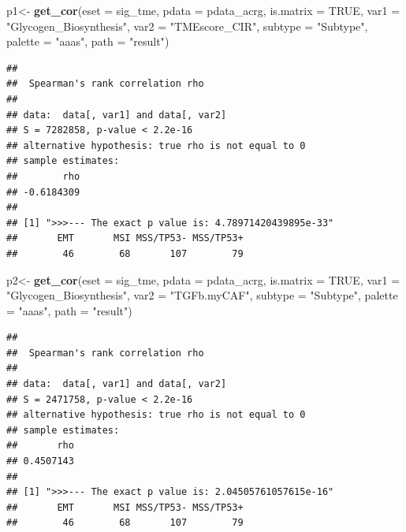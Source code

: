 \documentclass[
  12pt,
]{book}
\newenvironment{Shaded}{\begin{snugshade}}{\end{snugshade}}
\newcommand{\AttributeTok}[1]{\textcolor[rgb]{0.13,0.29,0.53}{#1}}
\newcommand{\ConstantTok}[1]{\textcolor[rgb]{0.56,0.35,0.01}{#1}}
\newcommand{\FunctionTok}[1]{\textcolor[rgb]{0.13,0.29,0.53}{\textbf{#1}}}
\newcommand{\NormalTok}[1]{#1}
\newcommand{\OtherTok}[1]{\textcolor[rgb]{0.56,0.35,0.01}{#1}}
\newcommand{\StringTok}[1]{\textcolor[rgb]{0.31,0.60,0.02}{#1}}
\begin{document}
\begin{Shaded}
\begin{Highlighting}[]
\NormalTok{p1}\OtherTok{\textless{}{-}} \FunctionTok{get\_cor}\NormalTok{(}\AttributeTok{eset =}\NormalTok{ sig\_tme, }\AttributeTok{pdata =}\NormalTok{ pdata\_acrg, }\AttributeTok{is.matrix =} \ConstantTok{TRUE}\NormalTok{, }\AttributeTok{var1 =} \StringTok{"Glycogen\_Biosynthesis"}\NormalTok{, }
             \AttributeTok{var2 =} \StringTok{"TMEscore\_CIR"}\NormalTok{, }\AttributeTok{subtype =} \StringTok{"Subtype"}\NormalTok{, }\AttributeTok{palette =} \StringTok{"aaas"}\NormalTok{, }\AttributeTok{path =} \StringTok{"result"}\NormalTok{)}
\end{Highlighting}
\end{Shaded}

\begin{verbatim}
## 
##  Spearman's rank correlation rho
## 
## data:  data[, var1] and data[, var2]
## S = 7282858, p-value < 2.2e-16
## alternative hypothesis: true rho is not equal to 0
## sample estimates:
##        rho 
## -0.6184309 
## 
## [1] ">>>--- The exact p value is: 4.78971420439895e-33"
##       EMT       MSI MSS/TP53- MSS/TP53+ 
##        46        68       107        79
\end{verbatim}

\begin{Shaded}
\begin{Highlighting}[]
\NormalTok{p2}\OtherTok{\textless{}{-}} \FunctionTok{get\_cor}\NormalTok{(}\AttributeTok{eset =}\NormalTok{ sig\_tme, }\AttributeTok{pdata =}\NormalTok{ pdata\_acrg, }\AttributeTok{is.matrix =} \ConstantTok{TRUE}\NormalTok{, }\AttributeTok{var1 =} \StringTok{"Glycogen\_Biosynthesis"}\NormalTok{, }
             \AttributeTok{var2 =} \StringTok{"TGFb.myCAF"}\NormalTok{, }\AttributeTok{subtype =} \StringTok{"Subtype"}\NormalTok{, }\AttributeTok{palette =} \StringTok{"aaas"}\NormalTok{, }\AttributeTok{path =} \StringTok{"result"}\NormalTok{)}
\end{Highlighting}
\end{Shaded}

\begin{verbatim}
## 
##  Spearman's rank correlation rho
## 
## data:  data[, var1] and data[, var2]
## S = 2471758, p-value < 2.2e-16
## alternative hypothesis: true rho is not equal to 0
## sample estimates:
##       rho 
## 0.4507143 
## 
## [1] ">>>--- The exact p value is: 2.04505761057615e-16"
##       EMT       MSI MSS/TP53- MSS/TP53+ 
##        46        68       107        79
\end{verbatim}
\end{document}
